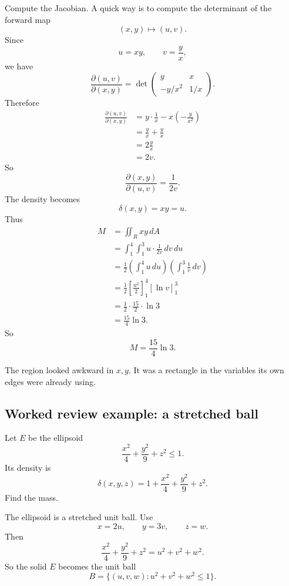 Compute the Jacobian.  A quick way is to compute the determinant of the forward map
\[
    (x,y)\longmapsto (u,v).
\]
Since
\[
    u=xy,
    \qquad
    v=\frac{y}{x},
\]
we have
\[
    \frac{\partial(u,v)}{\partial(x,y)}
    =
    \det
    \begin{pmatrix}
    y&x\\[1mm]
    -y/x^2&1/x
    \end{pmatrix}.
\]
Therefore
\[
\begin{aligned}
    \frac{\partial(u,v)}{\partial(x,y)}
    &=
    y\cdot\frac1x
    -
    x\left(-\frac{y}{x^2}\right)\\
    &=
    \frac{y}{x}+\frac{y}{x}\\
    &=
    2\frac{y}{x}\\
    &=
    2v.
\end{aligned}
\]
So
\[
\boxed{
    \frac{\partial(x,y)}{\partial(u,v)}=\frac{1}{2v}.
}
\]
The density becomes
\[
    \delta(x,y)=xy=u.
\]
Thus
\[
\begin{aligned}
M
&=
\iint_R xy\,dA\\
&=
\int_1^4\int_1^3
u\cdot\frac{1}{2v}\,dv\,du\\
&=
\frac12
\left(\int_1^4 u\,du\right)
\left(\int_1^3 \frac{1}{v}\,dv\right)\\
&=
\frac12
\left[\frac{u^2}{2}\right]_1^4
\left[\ln v\right]_1^3\\
&=
\frac12\cdot\frac{15}{2}\cdot\ln 3\\
&=
\frac{15}{4}\ln 3.
\end{aligned}
\]
So
\[
\boxed{
    M=\frac{15}{4}\ln 3.
}
\]

The region looked awkward in \(x,y\).  It was a rectangle in the variables its own
edges were already using.

\subsection{Worked review example: a stretched ball}

Let \(E\) be the ellipsoid
\[
    \frac{x^2}{4}+\frac{y^2}{9}+z^2\le1.
\]
Its density is
\[
    \delta(x,y,z)=
    1+\frac{x^2}{4}+\frac{y^2}{9}+z^2.
\]
Find the mass.

The ellipsoid is a stretched unit ball.  Use
\[
    x=2u,
    \qquad
    y=3v,
    \qquad
    z=w.
\]
Then
\[
    \frac{x^2}{4}+\frac{y^2}{9}+z^2
    =
    u^2+v^2+w^2.
\]
So the solid \(E\) becomes the unit ball
\[
    B=\{(u,v,w):u^2+v^2+w^2\le1\}.
\]

